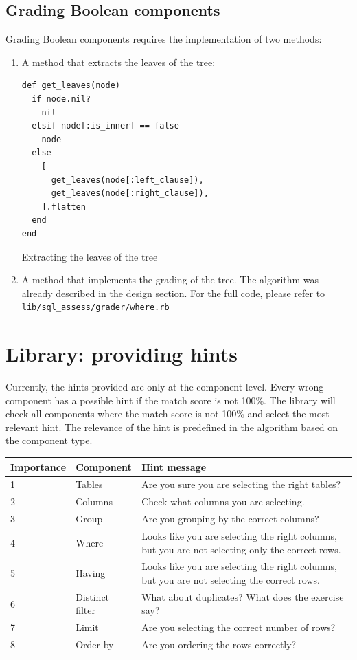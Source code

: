 \subsection{Grading Boolean components}

Grading Boolean components requires the implementation of two methods:
\begin{enumerate}
    \item A method that extracts the leaves of the tree:
    \begin{code}
    \begin{verbatim}
def get_leaves(node)
  if node.nil?
    nil
  elsif node[:is_inner] == false
    node
  else
    [
      get_leaves(node[:left_clause]),
      get_leaves(node[:right_clause]),
    ].flatten
  end
end
    \end{verbatim}
    \caption{Extracting the leaves of the tree}
    \end{code}
    \item A method that implements the grading of the tree. The algorithm was already described in the design section. For the full code, please refer to \texttt{lib/sql\_assess/grader/where.rb} 
\end{enumerate}

\section{Library: providing hints}

Currently, the hints provided are only at the component level. Every wrong component has a possible hint if the match score is not 100\%. The library will check all components where the match score is not 100\% and select the most relevant hint. The relevance of the hint is predefined in the algorithm based on the component type.

\begin{tabularx}{\textwidth}{|l|X|X|}
\hline
\textbf{Importance} & \textbf{Component} &
\textbf{Hint message}\\\hline
\endhead
1 & Tables & Are you sure you are selecting the right tables? \\\hline
2 & Columns & Check what columns you are selecting. \\\hline
3 & Group & Are you grouping by the correct columns? \\\hline
4 & Where & Looks like you are selecting the right columns, but you are not selecting only the correct rows. \\\hline
5 & Having & Looks like you are selecting the right columns, but you are not selecting the correct rows. \\\hline
6 & Distinct filter & What about duplicates? What does the exercise say? \\\hline
7 & Limit & Are you selecting the correct number of rows? \\\hline
8 & Order by & Are you ordering the rows correctly? \\\hline

\end{tabularx}

